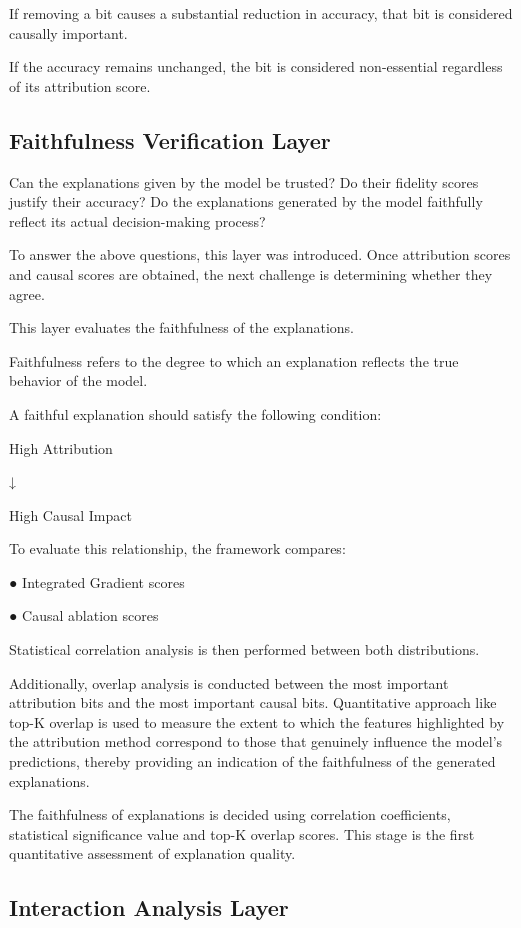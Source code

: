 If removing a bit causes a substantial reduction in accuracy, that bit is considered causally 
important. 

If the accuracy remains unchanged, the bit is considered non-essential regardless of its attribution 
score. 

\subsection{Faithfulness Verification Layer}

Can the explanations given by the model be trusted? Do their fidelity scores 
justify their accuracy? Do the explanations generated by the model faithfully reflect 
its actual decision-making process? 

To answer the above questions, this layer was introduced. Once attribution scores and 
causal scores are obtained, the next challenge is determining whether they agree.   

This layer evaluates the faithfulness of the explanations. 

Faithfulness refers to the degree to which an explanation reflects the true behavior of the model. 

A faithful explanation should satisfy the following condition: 

High Attribution 

↓ 

        High Causal Impact 

To evaluate this relationship, the framework compares: 

●  Integrated Gradient scores 

●  Causal ablation scores 

Statistical correlation analysis is then performed between both distributions. 

Additionally, overlap analysis is conducted between the most important attribution bits and the 
most important causal bits. Quantitative approach like top-K overlap is used to measure the 
extent to which the features highlighted by the attribution method correspond to those that 
genuinely influence the model's predictions, thereby providing an indication of the faithfulness 
of the generated explanations. 

The faithfulness of explanations is decided using correlation coefficients, statistical significance 
value and top-K overlap scores. This stage is the first quantitative assessment of explanation 
quality. 


\subsection{Interaction Analysis Layer}


